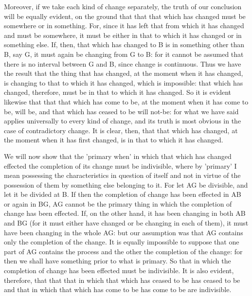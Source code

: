 Moreover, if we take each kind of change separately, the truth of
our conclusion will be equally evident, on the ground that that that
which has changed must be somewhere or in something. For, since it
has left that from which it has changed and must be somewhere, it
must be either in that to which it has changed or in something else.
If, then, that which has changed to B is in something other than B,
say G, it must again be changing from G to B: for it cannot be assumed
that there is no interval between G and B, since change is continuous.
Thus we have the result that the thing that has changed, at the moment
when it has changed, is changing to that to which it has changed,
which is impossible: that which has changed, therefore, must be in
that to which it has changed. So it is evident likewise that that
that which has come to be, at the moment when it has come to be, will
be, and that which has ceased to be will not-be: for what we have
said applies universally to every kind of change, and its truth is
most obvious in the case of contradictory change. It is clear, then,
that that which has changed, at the moment when it has first changed,
is in that to which it has changed. 

We will now show that the 'primary when' in which that which has changed
effected the completion of its change must be indivisible, where by
'primary' I mean possessing the characteristics in question of itself
and not in virtue of the possession of them by something else belonging
to it. For let AG be divisible, and let it be divided at B. If then
the completion of change has been effected in AB or again in BG, AG
cannot be the primary thing in which the completion of change has
been effected. If, on the other hand, it has been changing in both
AB and BG (for it must either have changed or be changing in each
of them), it must have been changing in the whole AG: but our assumption
was that AG contains only the completion of the change. It is equally
impossible to suppose that one part of AG contains the process and
the other the completion of the change: for then we shall have something
prior to what is primary. So that in which the completion of change
has been effected must be indivisible. It is also evident, therefore,
that that that in which that which has ceased to be has ceased to
be and that in which that which has come to be has come to be are
indivisible. 

